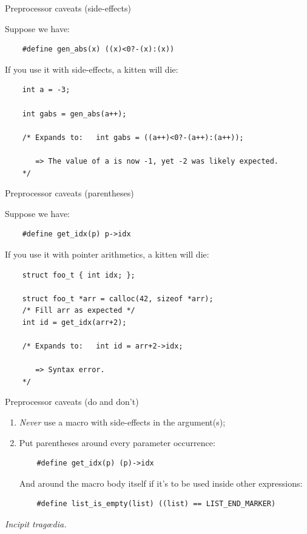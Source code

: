 \begin{frame}[fragile]{Preprocessor caveats (side-effects)}

  Suppose we have:
  \begin{lstlisting}
    #define gen_abs(x) ((x)<0?-(x):(x))
  \end{lstlisting}

  If you use it with side-effects, a kitten will die:
  \begin{lstlisting}
    int a = -3;

    int gabs = gen_abs(a++);

    /* Expands to:   int gabs = ((a++)<0?-(a++):(a++));
    
       => The value of a is now -1, yet -2 was likely expected.
    */
  \end{lstlisting}

\end{frame}

\begin{frame}[fragile]{Preprocessor caveats (parentheses)}

  Suppose we have:
  \begin{lstlisting}
    #define get_idx(p) p->idx
  \end{lstlisting}

  If you use it with pointer arithmetics, a kitten will die:
  \begin{lstlisting}
    struct foo_t { int idx; };
    
    struct foo_t *arr = calloc(42, sizeof *arr);
    /* Fill arr as expected */
    int id = get_idx(arr+2);

    /* Expands to:   int id = arr+2->idx;
    
       => Syntax error.
    */
  \end{lstlisting}

\end{frame}

\begin{frame}[fragile]{Preprocessor caveats (do and don't)}


  \begin{enumerate}
  \item {\em Never} use a macro with side-effects in the argument(s);
  \item Put parentheses around every parameter occurrence:
  \begin{lstlisting}
    #define get_idx(p) (p)->idx
  \end{lstlisting}
  And around the macro body itself if it's to be used inside other expressions:
  \begin{lstlisting}
    #define list_is_empty(list) ((list) == LIST_END_MARKER)
  \end{lstlisting}
  \end{enumerate}

  {\em Incipit trag\oe dia.}
  
\end{frame}

